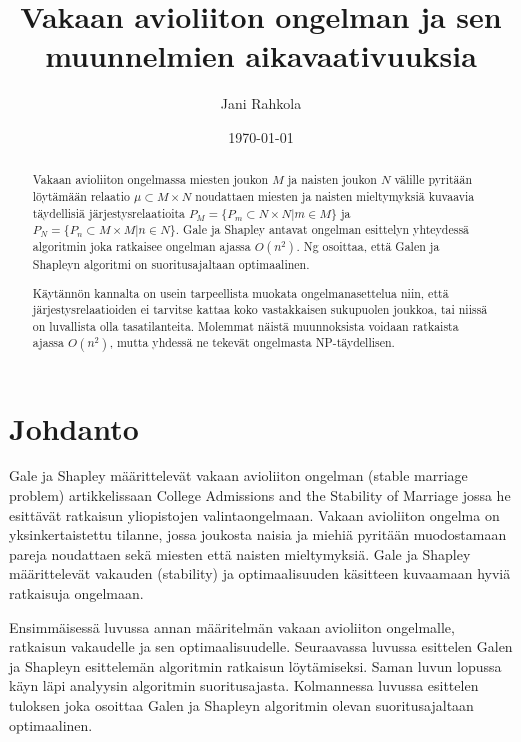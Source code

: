 \documentclass[gradu, twoside]{tktltiki}
\begin{document}
\title{Vakaan avioliiton ongelman ja sen muunnelmien aikavaativuuksia}
\author{Jani Rahkola}
\date{\today}
\level{}

\maketitle

\doublespacing

\subject{Tietojenkäsittelytiede}

\begin{abstract}
  Vakaan avioliiton ongelmassa miesten joukon $M$ ja naisten joukon
  $N$ välille pyritään löytämään relaatio $\mu \subset M \times N$
  noudattaen miesten ja naisten mieltymyksiä kuvaavia täydellisiä
  järjestysrelaatioita $P_M = \{P_m \subset N \times N | m \in M\}$ ja
  $P_N = \{P_n \subset M \times M | n \in N\}$. Gale ja Shapley
  antavat ongelman esittelyn yhteydessä algoritmin joka ratkaisee
  ongelman ajassa $O(n^2)$. Ng osoittaa, että Galen ja Shapleyn
  algoritmi on suoritusajaltaan optimaalinen.

  Käytännön kannalta on usein tarpeellista muokata ongelmanasettelua
  niin, että järjestysrelaatioiden ei tarvitse kattaa koko vastakkaisen
  sukupuolen joukkoa, tai niissä on luvallista olla tasatilanteita.
  Molemmat näistä muunnoksista voidaan ratkaista ajassa $O(n^2)$, mutta
  yhdessä ne tekevät ongelmasta NP-täydellisen.
\end{abstract}

\mytableofcontents

\section{Johdanto}

Gale ja Shapley määrittelevät vakaan avioliiton ongelman (stable
marriage problem) artikkelissaan College Admissions and the Stability
of Marriage \cite{galeshapley62} jossa he esittävät ratkaisun
yliopistojen valintaongelmaan. Vakaan avioliiton ongelma on
yksinkertaistettu tilanne, jossa joukosta naisia ja miehiä pyritään
muodostamaan pareja noudattaen sekä miesten että naisten mieltymyksiä.
Gale ja Shapley määrittelevät vakauden (stability) ja optimaalisuuden
käsitteen kuvaamaan hyviä ratkaisuja ongelmaan.

Ensimmäisessä luvussa annan määritelmän vakaan avioliiton ongelmalle,
ratkaisun vakaudelle ja sen optimaalisuudelle. Seuraavassa luvussa
esittelen Galen ja Shapleyn esittelemän algoritmin ratkaisun
löytämiseksi. Saman luvun lopussa käyn läpi analyysin algoritmin
suoritusajasta. Kolmannessa luvussa esittelen tuloksen joka osoittaa
Galen ja Shapleyn algoritmin olevan suoritusajaltaan optimaalinen.
\end{document}
